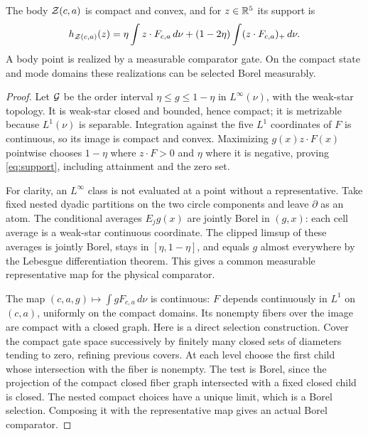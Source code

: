 \begin{lemma}\label{lem:body}
The body $\mathcal Z(c,a)$ is compact and convex, and for $z\in\mathbb R^5$ its support is
\begin{equation}
 h_{\mathcal Z(c,a)}(z)=\eta\int z\cdot F_{c,a}\,d\nu
       +(1-2\eta)\int (z\cdot F_{c,a})_+\,d\nu.
 \label{eq:support}
\end{equation}
A body point is realized by a measurable comparator gate. On the compact
state and mode domains these realizations can be selected Borel measurably.
\end{lemma}
\begin{proof}
Let $\mathcal G$ be the order interval $\eta\le g\le1-\eta$ in $L^\infty(\nu)$,
with the weak-star topology. It is weak-star closed and bounded, hence
compact; it is metrizable because $L^1(\nu)$ is separable. Integration
against the five $L^1$ coordinates of $F$ is continuous, so its image is
compact and convex. Maximizing $g(x)z\cdot F(x)$ pointwise chooses $1-\eta$
where $z\cdot F>0$ and $\eta$ where it is negative, proving
\eqref{eq:support}, including attainment and the zero set.

For clarity, an $L^\infty$ class is not evaluated at a point without a
representative. Take fixed nested dyadic partitions on the two circle
components and leave $\partial$ as an atom. The conditional averages
$E_jg(x)$ are jointly Borel in $(g,x)$: each cell average is a weak-star
continuous coordinate. The clipped limsup of these averages is jointly
Borel, stays in $[\eta,1-\eta]$, and equals $g$ almost everywhere by the
Lebesgue differentiation theorem. This gives a common measurable
representative map for the physical comparator.

The map $(c,a,g)\mapsto\int gF_{c,a}\,d\nu$ is continuous: $F$ depends
continuously in $L^1$ on $(c,a)$, uniformly on the compact domains. Its
nonempty fibers over the image are compact with a closed graph. Here is a
direct selection construction. Cover the compact gate space successively
by finitely many closed sets of diameters tending to zero, refining previous
covers. At each level choose the first child whose intersection with the
fiber is nonempty. The test is Borel, since the projection of the compact
closed fiber graph intersected with a fixed closed child is closed. The
nested compact choices have a unique limit, which is a Borel selection.
Composing it with the representative map gives an actual Borel comparator.
\end{proof}

